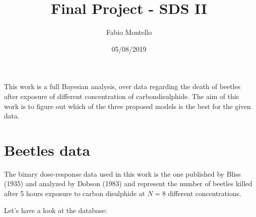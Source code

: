 \documentclass[]{article}
\title{Final Project - SDS II}
\author{Fabio Montello}
\date{05/08/2019}
\begin{document}
\maketitle

This work is a full Bayesian analysis, over data regarding the death of
beetles after exposure of different concentration of carbondisulphide.
The aim of this work is to figure out which of the three proposed models
is the best for the given data.

\hypertarget{beetles-data}{%
\section{Beetles data}\label{beetles-data}}

The binary dose-response data used in this work is the one published by
Bliss (1935) and analyzed by Dobson (1983) and represent the number of
beetles killed after 5 hours exposure to carbon disulphide at \(N = 8\)
different concentrations.

Let's have a look at the database:
\end{document}
